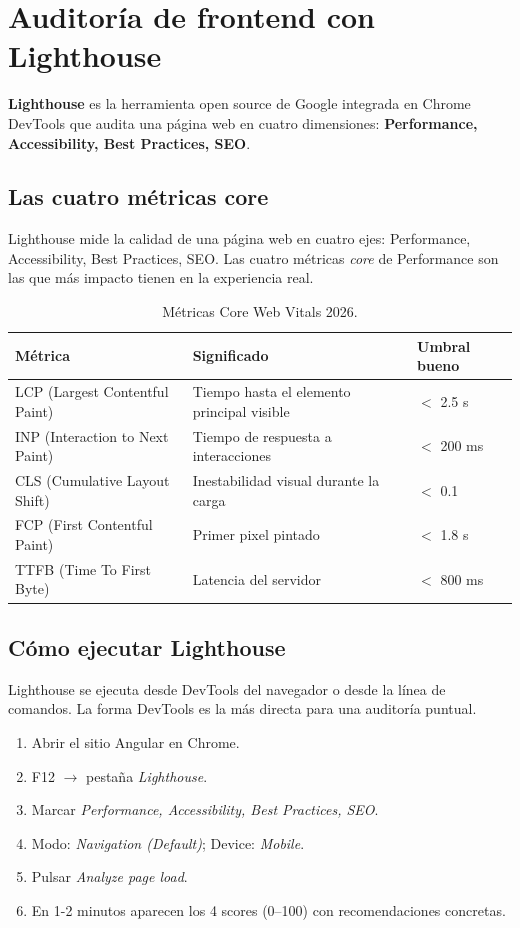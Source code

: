 \section{Auditoría de frontend con Lighthouse}

\textbf{Lighthouse} es la herramienta open source de Google integrada
en Chrome DevTools que audita una página web en cuatro dimensiones:
\textbf{Performance, Accessibility, Best Practices, SEO}.

\subsection{Las cuatro métricas core}

Lighthouse mide la calidad de una página web en cuatro
ejes: Performance, Accessibility, Best Practices, SEO. Las cuatro
métricas \emph{core} de Performance son las que más impacto tienen
en la experiencia real.


\begin{table}[htbp]
\centering
\caption{Métricas Core Web Vitals 2026.}
\footnotesize
\begin{tabularx}{\textwidth}{lXl}
\toprule
\textbf{Métrica} & \textbf{Significado} & \textbf{Umbral bueno}\\
\midrule
LCP (Largest Contentful Paint) & Tiempo hasta el elemento principal visible & $<$ 2.5 s\\
INP (Interaction to Next Paint) & Tiempo de respuesta a interacciones & $<$ 200 ms\\
CLS (Cumulative Layout Shift) & Inestabilidad visual durante la carga & $<$ 0.1\\
FCP (First Contentful Paint) & Primer pixel pintado & $<$ 1.8 s\\
TTFB (Time To First Byte) & Latencia del servidor & $<$ 800 ms\\
\bottomrule
\end{tabularx}
\end{table}

\subsection{Cómo ejecutar Lighthouse}

Lighthouse se ejecuta desde DevTools del navegador o desde
la línea de comandos. La forma DevTools es la más directa para una
auditoría puntual.


\begin{enumerate}
\item Abrir el sitio Angular en Chrome.
\item F12 $\rightarrow$ pestaña \emph{Lighthouse}.
\item Marcar \emph{Performance, Accessibility, Best Practices, SEO}.
\item Modo: \emph{Navigation (Default)}; Device: \emph{Mobile}.
\item Pulsar \emph{Analyze page load}.
\item En 1-2 minutos aparecen los 4 scores (0--100) con
recomendaciones concretas.
\end{enumerate}

